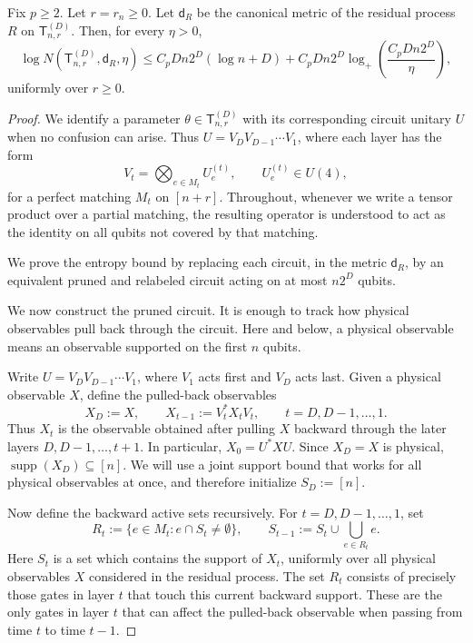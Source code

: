 \documentclass[10pt,a4paper]{amsart}
\begin{document}
\begin{proposition}
\label{prop:full-residual-entropy}
Fix \(p\ge2\). Let \(r=r_n\ge0\). Let \(\mathsf{d}_{R}\) be the canonical metric of the residual process
$R$ on \(\mathsf{T}_{n,r}^{(D)}\). Then, for every \(\eta>0\),
\[
\log N(\mathsf{T}_{n,r}^{(D)},\mathsf{d}_{R},\eta)
\le
C_pDn2^D(\log n+D)
+
C_pDn2^D
\log_+\left(\frac{C_pDn2^D}{\eta}\right),
\]
uniformly over \(r\ge0\).
\end{proposition}

\begin{proof}
We identify a parameter
\(\theta\in\mathsf{T}_{n,r}^{(D)}\) with its corresponding circuit unitary \(U\) when no
confusion can arise. Thus $U=V_DV_{D-1}\cdots V_1$, where each layer has the form
\[
    V_t
    =
    \bigotimes_{e\in M_t}U_e^{(t)},
    \qquad
    U_e^{(t)}\in U(4),
\]
for a perfect matching \(M_t\) on \([n+r]\). Throughout, whenever we
write a tensor product over a partial matching, the resulting operator is
understood to act as the identity on all qubits not covered by that matching.

We prove the entropy bound by replacing each circuit, in the metric
\(\mathsf{d}_{R}\), by an equivalent pruned and relabeled circuit acting on at most \(n2^D\) qubits.

We now construct the pruned circuit. It is enough to track how physical
observables pull back through the circuit. Here and below, a physical observable means an observable supported on the first \(n\) qubits.

Write $U=V_DV_{D-1}\cdots V_1$, where \(V_1\) acts first and \(V_D\) acts last. Given a physical observable \(X\), define the pulled-back observables
\[
    X_D:=X,
    \qquad
    X_{t-1}:=V_t^*X_tV_t,
    \qquad t=D,D-1,\dots,1.
\]
Thus \(X_t\) is the observable obtained after pulling \(X\) backward through
the later layers \(D,D-1,\dots,t+1\). In particular, $X_0=U^*XU.$
Since \(X_D=X\) is physical, \(\operatorname{supp}(X_D)\subseteq[n]\). We will
use a joint support bound that works for all physical observables at once, and therefore initialize $S_D:=[n].$

Now define the backward active sets recursively. For \(t=D,D-1,\dots,1\), set
\[
    R_t:=\{e\in M_t:e\cap S_t\neq\emptyset\},
    \qquad
    S_{t-1}:=S_t\cup\bigcup_{e\in R_t}e.
\]
Here \(S_t\) is a set which contains the support of $X_t$, uniformly over all physical observables \(X\) considered in the residual process. The
set \(R_t\) consists of precisely those gates in layer \(t\) that touch this
current backward support. These are the only gates in layer \(t\) that can
affect the pulled-back observable when passing from time \(t\) to time
\(t-1\).


\end{proof}
\end{document}
